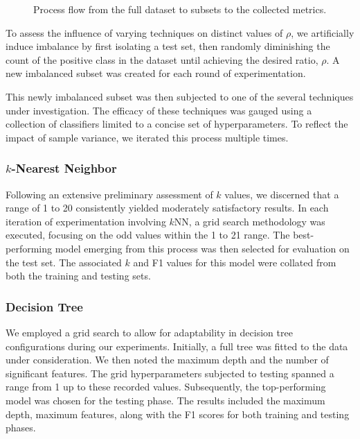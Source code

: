 \documentclass[journal]{IEEEtran}
\begin{document}
\begin{figure}
	\caption{Process flow from the full dataset to subsets to the collected metrics.}
	\label{fig:trajectory}
\end{figure}

	To assess the influence of varying techniques on distinct values of $\rho$, we artificially induce imbalance by
	first isolating a test set, then randomly diminishing the count of the positive class in the dataset until achieving the desired ratio, $\rho$. 
	A new imbalanced subset was created for each round of experimentation.
	
	This newly imbalanced subset was then subjected to one of the several techniques under investigation.
	The efficacy of these techniques was gauged using a collection of classifiers limited to a concise set of hyperparameters.
	To reflect the impact of sample variance, we iterated this process multiple times.

	\subsubsection{$k$-Nearest Neighbor}
	Following an extensive preliminary assessment of $k$ values, we discerned that a range of 1 to 20 consistently yielded moderately satisfactory results. In each iteration of experimentation involving $k$NN, a grid search methodology was executed, focusing on the odd values within the 1 to 21 range. The best-performing model emerging from this process was then selected for evaluation on the test set. The associated $k$ and F1 values for this model were collated from both the training and testing sets.

	\subsubsection{Decision Tree}
	We employed a grid search to allow for adaptability in decision tree configurations during our experiments. Initially, a full tree was fitted to the data under consideration. We then noted the maximum depth and the number of significant features. The grid hyperparameters subjected to testing spanned a range from 1 up to these recorded values. Subsequently, the top-performing model was chosen for the testing phase. The results included the maximum depth, maximum features, along with the F1 scores for both training and testing phases.
\end{document}
